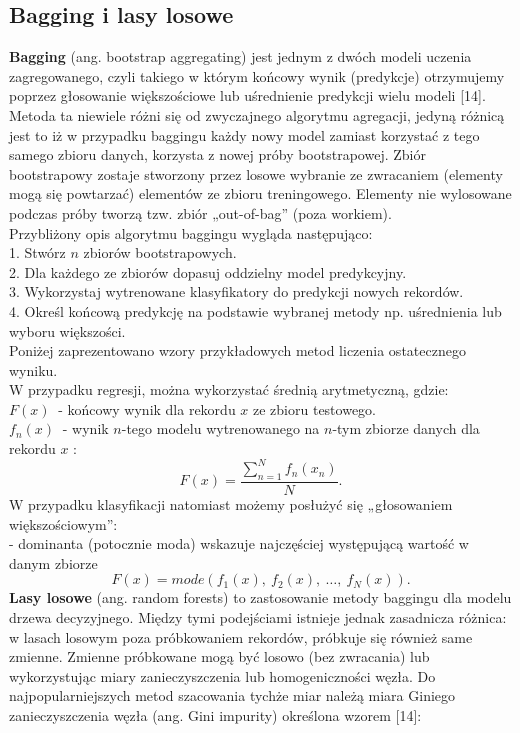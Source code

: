 \documentclass[a4paper,12pt,oneside]{book}
\begin{document}
\subsection{Bagging i lasy losowe}
\textbf{Bagging} (ang. bootstrap aggregating) jest jednym z dwóch modeli uczenia zagregowanego, czyli takiego w którym końcowy wynik (predykcje) otrzymujemy poprzez głosowanie większościowe lub uśrednienie predykcji wielu modeli [14]. Metoda ta niewiele różni się od zwyczajnego algorytmu agregacji, jedyną różnicą jest to iż w przypadku baggingu każdy nowy model zamiast korzystać z tego samego zbioru danych, korzysta z nowej próby bootstrapowej. Zbiór bootstrapowy zostaje stworzony przez losowe wybranie ze zwracaniem (elementy mogą się powtarzać) elementów ze zbioru treningowego. Elementy nie wylosowane podczas próby tworzą tzw. zbiór „out-of-bag” (poza workiem).\\
Przybliżony opis algorytmu baggingu wygląda następująco:\\
1. Stwórz $n$ zbiorów bootstrapowych.\\
2. Dla każdego ze zbiorów dopasuj oddzielny model predykcyjny.\\
3. Wykorzystaj wytrenowane klasyfikatory do predykcji nowych rekordów.\\
4. Określ końcową predykcję na podstawie wybranej metody np. uśrednienia lub wyboru większości.\\
Poniżej zaprezentowano wzory przykładowych metod liczenia ostatecznego wyniku.\\
W przypadku regresji, można wykorzystać średnią arytmetyczną, gdzie:\\
\noindent $F\left(x\right)\ $ - końcowy wynik dla rekordu $x$ ze zbioru testowego.\\
\noindent $f_n\left(x\right)\ $ - wynik $n$-tego modelu wytrenowanego na $n$-tym zbiorze danych dla rekordu $x$ :\\
\noindent
\begin{equation}
F\left(x\right)=\frac{\sum^N_{n=1}{f_n(x_n)}}{N}.
\end{equation}
W przypadku klasyfikacji natomiast możemy posłużyć się „głosowaniem większościowym”:\\
- dominanta (potocznie moda) wskazuje najczęściej występującą wartość w danym zbiorze
\noindent
\begin{equation}
F\left(x\right)=mode\left(f_1\left(x\right),\ f_2\left(x\right),\ \dots ,\ f_N\left(x\right)\right).
\end{equation}
\textbf{Lasy losowe} (ang. random forests) to zastosowanie metody baggingu dla modelu drzewa decyzyjnego. Między tymi podejściami istnieje jednak zasadnicza różnica: w lasach losowym poza próbkowaniem rekordów, próbkuje się również same zmienne. Zmienne próbkowane mogą być losowo (bez zwracania) lub wykorzystując miary zanieczyszczenia lub homogeniczności węzła. Do najpopularniejszych metod szacowania tychże miar należą miara Giniego zanieczyszczenia węzła (ang. Gini impurity) określona wzorem [14]:\\
\end{document}
